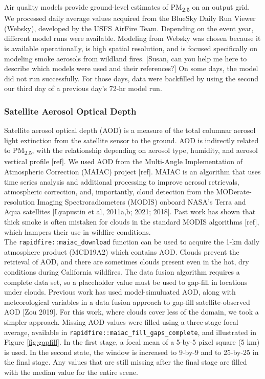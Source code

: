 \documentclass[gmd, manuscript]{copernicus}
\begin{document}
Air quality models provide ground-level estimates of
PM\textsubscript{2.5} on an output grid. We processed daily average
values acquired from the BlueSky Daily Run Viewer (Websky), developed by
the USFS AirFire Team. Depending on the event year, different model runs
were available. Modeling from Websky was chosen because it is available
operationally, is high spatial resolution, and is focused specifically
on modeling smoke aerosols from wildland fires. {[}Susan, can you help
me here to describe which models were used and their references?{]} On
some days, the model did not run successfully. For those days, data were
backfilled by using the second our third day of a previous day's 72-hr
model run.

\subsubsection{Satellite Aerosol Optical Depth}

Satellite aerosol optical depth (AOD) is a measure of the total columnar
aerosol light extinction from the satellite sensor to the ground. AOD is
indirectly related to PM\textsubscript{2.5}, with the relationship
depending on aerosol type, humidity, and aerosol vertical profile
{[}ref{]}. We used AOD from the Multi-Angle Implementation of
Atmospheric Correction (MAIAC) project {[}ref{]}. MAIAC is an algorithm
that uses time series analysis and additional processing to improve
aerosol retrievals, atmospheric correction, and, importantly, cloud
detection from the MODerate-resolution Imaging Spectroradiometers
(MODIS) onboard NASA's Terra and Aqua satellites {[}Lyapustin et al,
2011a,b; 2021; 2018{]}. Past work has shown that thick smoke is often
mistaken for clouds in the standard MODIS algorithms {[}ref{]}, which
hampers their use in wildfire conditions.\\
The \texttt{rapidfire::maiac\_download} function can be used to acquire
the 1-km daily atmosphere product (MCD19A2) which contains AOD. Clouds
prevent the retrieval of AOD, and there are sometimes clouds present
even in the hot, dry conditions during California wildfires. The data
fusion algorithm requires a complete data set, so a placeholder value
must be used to gap-fill in locations under clouds. Previous work has
used model-simuluated AOD, along with meteorological variables in a data
fusion approach to gap-fill satellite-observed AOD {[}Zou 2019{]}. For
this work, where clouds cover less of the domain, we took a simpler
approach. Missing AOD values were filled using a three-stage focal
average, available in \texttt{rapidfire::maiac\_fill\_gaps\_complete},
and illustrated in Figure \ref{fig:gapfill}. In the first stage, a focal
mean of a 5-by-5 pixel square (5 km) is used. In the second state, the
window is increased to 9-by-9 and to 25-by-25 in the final stage. Any
values that are still missing after the final stage are filled with the
median value for the entire scene.
\end{document}
